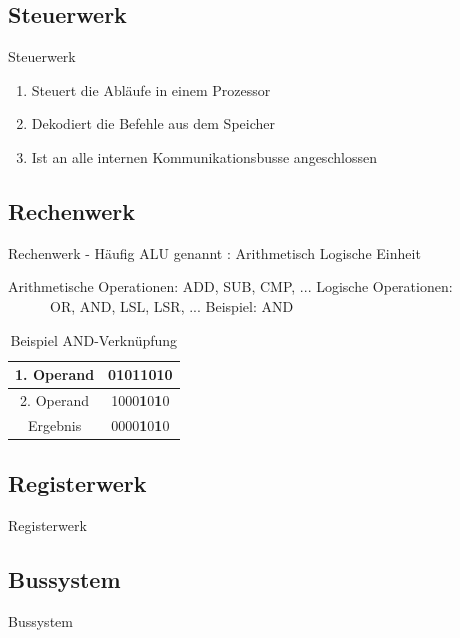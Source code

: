 \documentclass{beamer}
\begin{document}
\subsection{Steuerwerk}
\begin{frame}{Steuerwerk}
\begin{enumerate}
\item{Steuert die Abl\"aufe in einem Prozessor}
\item{Dekodiert die Befehle aus dem Speicher}
\item{Ist an alle internen Kommunikationsbusse angeschlossen}
\end{enumerate}
\end{frame}



\subsection{Rechenwerk}
\begin{frame}[t]{Rechenwerk}
- H\"aufig ALU genannt : Arithmetisch Logische Einheit \par \bigskip
Arithmetische Operationen: ADD, SUB, CMP, ...\newline
Logische Operationen: \ \ \ \ \ \ OR, AND, LSL, LSR, ...
Beispiel: AND 
\pause
\begin{table}[]
\begin{tabular}{|c|c|}
\hline
1. Operand & 0101\textbf{1}0\textbf{1}0 \\ \hline
2. Operand & 1000\textbf{1}0\textbf{1}0 \\ \hline\hline
Ergebnis   & 0000\textbf{1}0\textbf{1}0 \\ \hline
\end{tabular}
\centering
\caption{Beispiel AND-Verkn\"upfung}
\end{table}
\end{frame}


\subsection{Registerwerk}
\begin{frame}{Registerwerk}
\end{frame}

\subsection{Bussystem}
\begin{frame}{Bussystem}

\end{frame}
\end{document}
